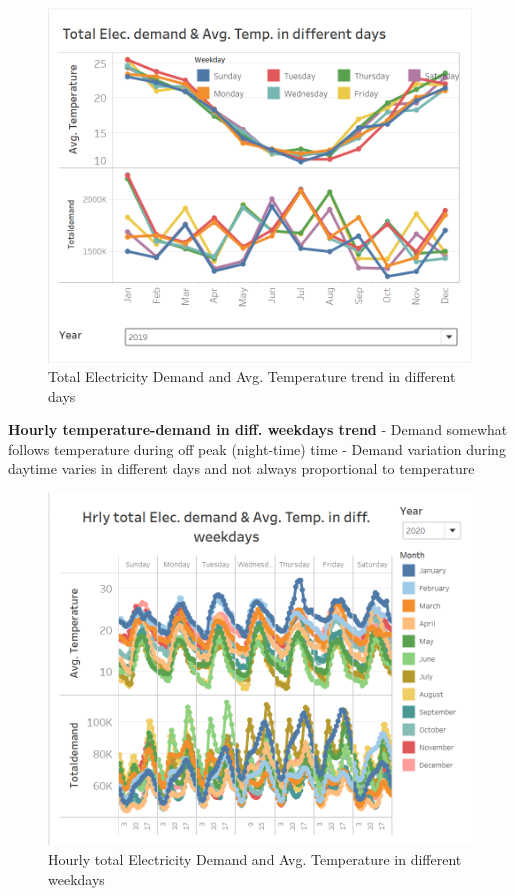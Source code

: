 \documentclass[mstat,12pt]{unswthesis}
\begin{document}
\begin{figure}[H]
\includegraphics{snapshots1/Slide 3 snapshot 2.png}
\caption{Total Electricity Demand and Avg. Temperature trend in different days}\label{4.3}
\end{figure}

\textbf{Hourly temperature-demand in diff. weekdays trend} \newline
\newline - Demand somewhat follows temperature during off peak
(night-time) time \newline - Demand variation during daytime varies in
different days and not always proportional to temperature \newline

\begin{figure}[H]
\includegraphics{snapshots1/Slide 4 snapshot 1.png}
\caption{Hourly total Electricity Demand and Avg. Temperature in different weekdays}\label{4.4}
\end{figure}
\end{document}
